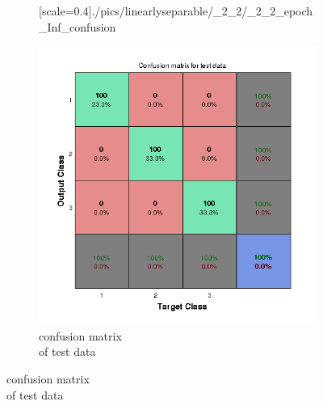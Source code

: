 \documentclass[fleqn]{article}
\begin{document}
\begin{figure}[!ht]
\begin{subfigure}{.5\textwidth}
[scale=0.4]{./pics/linearlyseparable/_2_2/_2_2_epoch_Inf_confusion}
\end{subfigure}
\begin{subfigure}{.5\textwidth}
\caption{confusion matrix \\ of test data}
\includegraphics[scale=0.4]{./pics/linearlyseparable/_2_2/_2_2_epoch_Inf_confusiontest}
\end{subfigure}
\end{figure}
\end{document}

